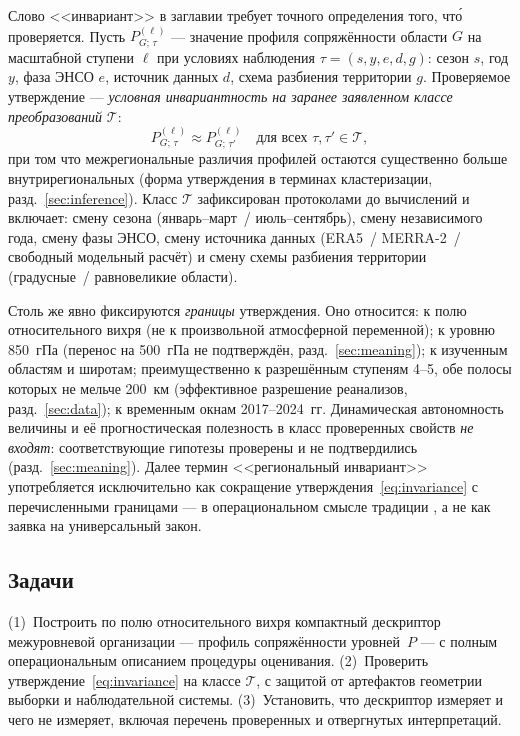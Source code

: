 \documentclass[11pt,a4paper]{article}
\begin{document}
Слово <<инвариант>> в заглавии требует точного определения того, чт\'{о} проверяется. Пусть $P^{(\ell)}_{G;\,\tau}$ --- значение профиля сопряжённости области $G$ на масштабной ступени $\ell$ при условиях наблюдения $\tau=(s,y,e,d,g)$: сезон $s$, год $y$, фаза ЭНСО $e$, источник данных $d$, схема разбиения территории $g$. Проверяемое утверждение --- \emph{условная инвариантность на заранее заявленном классе преобразований} $\mathcal{T}$:
\begin{equation}
P^{(\ell)}_{G;\,\tau}\approx P^{(\ell)}_{G;\,\tau'}
\quad\text{для всех }\tau,\tau'\in\mathcal{T},
\label{eq:invariance}
\end{equation}
при том что межрегиональные различия профилей остаются существенно больше внутрирегиональных (форма утверждения в терминах кластеризации, разд.~\ref{sec:inference}). Класс $\mathcal{T}$ зафиксирован протоколами до вычислений и включает: смену сезона (январь--март~/ июль--сентябрь), смену независимого года, смену фазы ЭНСО, смену источника данных (ERA5~/ MERRA-2~/ свободный модельный расчёт) и смену схемы разбиения территории (градусные~/ равновеликие области).

Столь же явно фиксируются \emph{границы} утверждения. Оно относится: к полю относительного вихря (не к произвольной атмосферной переменной); к уровню 850~гПа (перенос на 500~гПа не подтверждён, разд.~\ref{sec:meaning}); к изученным областям и широтам; преимущественно к разрешённым ступеням 4--5, обе полосы которых не мельче 200~км (эффективное разрешение реанализов, разд.~\ref{sec:data}); к временным окнам 2017--2024~гг. Динамическая автономность величины и её прогностическая полезность в класс проверенных свойств \emph{не входят}: соответствующие гипотезы проверены и не подтвердились (разд.~\ref{sec:meaning}). Далее термин <<региональный инвариант>> употребляется исключительно как сокращение утверждения~\eqref{eq:invariance} с перечисленными границами --- в операциональном смысле традиции \cite{Puzachenko2010}, а не как заявка на универсальный закон.

\subsection{Задачи}

(1)~Построить по полю относительного вихря компактный дескриптор межуровневой организации --- профиль сопряжённости уровней~$P$ --- с полным операциональным описанием процедуры оценивания. (2)~Проверить утверждение~\eqref{eq:invariance} на классе $\mathcal{T}$, с защитой от артефактов геометрии выборки и наблюдательной системы. (3)~Установить, что дескриптор измеряет и чего не измеряет, включая перечень проверенных и отвергнутых интерпретаций.
\end{document}
